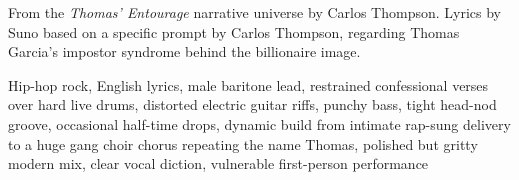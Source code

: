 
\begin{notes}
From the \emph{Thomas' Entourage} narrative universe by Carlos Thompson. Lyrics by Suno based on a specific prompt by Carlos Thompson, regarding Thomas Garcia's impostor syndrome behind the billionaire image.
\end{notes}
\begin{style}
Hip-hop rock, English lyrics, male baritone lead, restrained confessional verses over hard live drums, distorted electric guitar riffs, punchy bass, tight head-nod groove, occasional half-time drops, dynamic build from intimate rap-sung delivery to a huge gang choir chorus repeating the name Thomas, polished but gritty modern mix, clear vocal diction, vulnerable first-person performance
\end{style}
